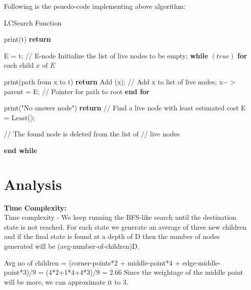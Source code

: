 Following is the psuedo-code implementing above algorithm:\\
\begin{algorithm}
\caption{LCSearch Function}
    \label{fup}
    \begin{algorithmic}[1]
            \State print(t)
            \State \textbf{return} 
        \EndIf
        
        \State E = t; // E-node
        \State Initialize the list of live nodes to be empty;
        \State
        \State \textbf{while} $(true)$ 
        \State \textbf{for} each child $x$ of $E$ 
                
                    \State print(path from x to t)
                    \State \textbf{return}
                \EndIf
                \State Add (x); // Add x to list of live nodes;
                \State x$->$parent = E; // Pointer for path to root
        \State \textbf{end for}
        
        \State
            \State print("No answer node")
            \State \textbf{return}
        \EndIf
        \State
        \State// Find a live node with least estimated cost
        \State E = Least(); 

        \State // The found node is deleted from the list of 
        \State // live nodes
        
        \State \textbf{end while}
        
        
    \EndFunction
  \end{algorithmic}
\end{algorithm}

\section{Analysis}


\textbf{Time Complexity:} \\
Time complexity - 
 We keep running the BFS-like search until the destination state is not reached. For each state we generate an average of three new children and if the final state is found at a depth of D then the number of nodes generated will be (avg-number-of-children)D.

Avg no of children = (corner-points*2 + middle-point*4 + edge-middle-point*3)/9
		=   (4*2+1*4+4*3)/9  =  2.66 
Since the weightage of the middle point will be more, we can approximate it to 3. 

